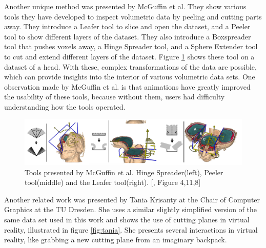 Another unique method was presented by McGuffin et al.\cite{McGuffin}
They show various tools they have developed to inspect volumetric data by peeling and cutting parts away.
They introduce a Leafer tool to slice and open the dataset, and a Peeler tool to show different layers of the dataset. They also introduce a Boxspreader tool that pushes voxels away, a Hinge Spreader tool, and a Sphere Extender tool to cut and extend different layers of the dataset. Figure \ref{fig:McGuffin} shows these tool on a dataset of a head. 
With these, complex transformations of the data are possible, which can provide insights into the interior of various volumetric data sets.
One observation made by McGuffin et al. is that animations have greatly improved the usability of these tools, because without them, users had difficulty understanding how the tools operated. 
\begin{figure}[h]
	\centering
	\includegraphics[width=1\linewidth]{fig/Images/McGuffin_fig_4_fig11_fig8}
	\caption[]{Tools presented by McGuffin et al. Hinge Spreader(left), Peeler tool(middle) and the Leafer tool(right). [\cite{McGuffin}, Figure 4,11,8]}
	\label{fig:McGuffin}
\end{figure}

Another related work was presented by Tania Krisanty at the Chair of Computer Graphics at the TU Dresden. She uses a similar slightly simplified version of the same data set used in this work and shows the use of cutting planes in virtual reality, illustrated in figure \ref{fig:tania}.\cite{krisanty_2022}
She presents several interactions in virtual reality, like grabbing a new cutting plane from an imaginary backpack. 

